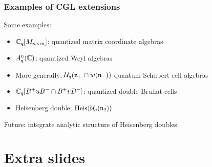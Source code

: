 \documentclass[aspectratio=169]{beamer}
\begin{document}
\begin{frame}
	\frametitle{Examples of CGL extensions}

	Some examples:
	\begin{itemize}
		\item $\mathbb{C}_q[M_{n\times m}]$: quantized matrix coordinate algebras
		\item $A^n_q(\mathbb{C})$: quantized Weyl algebras
		\item More generally: $\mathcal{U}_q(\mathfrak{n}_+ \cap w(\mathfrak{n}_-))$ quantum Schubert cell algebras
		\item $\mathbb{C}_q[B^+ u B^- \cap B^+ v B^-]$: quantized double Bruhat cells \pause
		\item Heisenberg double: $\operatorname{Heis}(\mathcal{U}_q(\mathfrak{n}_2))$
	\end{itemize}
	\medskip
	\pause
	Future: integrate analytic structure of Heisenberg doubles

\end{frame}

\appendix

\section{Extra slides}
\end{document}
